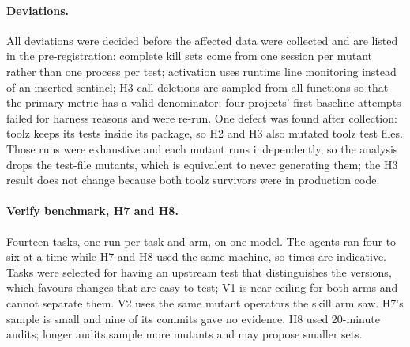 \paragraph{Deviations.} All deviations were decided before the affected data were collected and are listed in the pre-registration: complete kill sets come from one session per mutant rather than one process per test; activation uses runtime line monitoring instead of an inserted sentinel; H3 call deletions are sampled from all functions so that the primary metric has a valid denominator; four projects' first baseline attempts failed for harness reasons and were re-run. One defect was found after collection: toolz keeps its tests inside its package, so H2 and H3 also mutated toolz test files. Those runs were exhaustive and each mutant runs independently, so the analysis drops the test-file mutants, which is equivalent to never generating them; the H3 result does not change because both toolz survivors were in production code.

\paragraph{Verify benchmark, H7 and H8.} Fourteen tasks, one run per task and arm, on one model. The agents ran four to six at a time while H7 and H8 used the same machine, so times are indicative. Tasks were selected for having an upstream test that distinguishes the versions, which favours changes that are easy to test; V1 is near ceiling for both arms and cannot separate them. V2 uses the same mutant operators the skill arm saw. H7's sample is small and nine of its commits gave no evidence. H8 used 20-minute audits; longer audits sample more mutants and may propose smaller sets.
